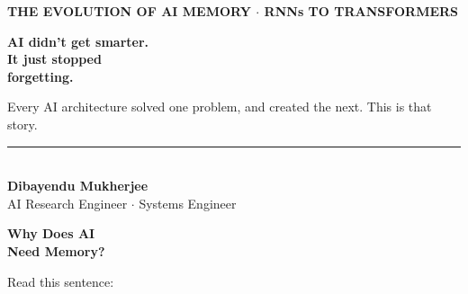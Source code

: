 \documentclass[11pt]{article}
\begin{document}
\thispagestyle{empty}
\vspace*{0.8in}
\begin{center}
    
    {\fontsize{14}{16}\selectfont\color{brandblue}\textbf{THE EVOLUTION OF AI MEMORY $\cdot$ \quad RNNs TO TRANSFORMERS}}
    
    \vspace{0.8in}
    
    {\fontsize{40}{48}\selectfont\color{brandnavy}\bfseries AI didn't get smarter.\\It just stopped\\forgetting.}
    
    \vspace{0.6in}
    
    {\fontsize{18}{24}\selectfont\color{brandgray}
Every AI architecture solved one problem, and created the next. This is that story.}
    
    \vfill
    
    \begin{minipage}{0.8\textwidth}
        \centering
        \rule{0.6\linewidth}{0.5pt} \\
        \vspace{0.2in}
        {\fontsize{12}{14}\selectfont\color{brandnavy}\textbf{Dibayendu Mukherjee}} \\
        \vspace{0.05in}
        {\fontsize{10}{12}\selectfont\color{brandgray}AI Research Engineer \quad $\cdot$ \quad Systems Engineer}
    \end{minipage}
    
\end{center}
\newpage

\vspace*{0.4in}

\begin{center}
{\fontsize{26}{30}\selectfont\color{brandnavy}\bfseries Why Does AI\\Need Memory?}
\end{center}

\vspace{0.3in}

{\large\color{brandgray}Read this sentence:}
\end{document}
